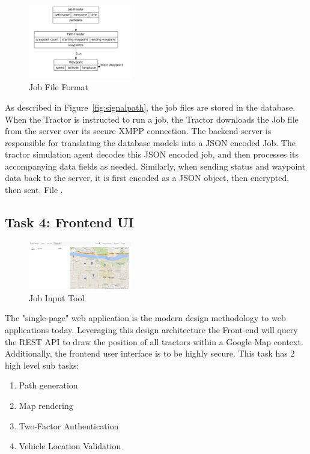 \documentclass[conference,12pt]{IEEEtran}
\begin{document}
\begin{figure}
\centering
\includegraphics[width=0.4\textwidth]{Images/job_file.png}
\caption{Job File Format}
\label{fig:job_file}
\end{figure}

As described in Figure~\ref{fig:signalpath}, the job files are stored in the
database. When the Tractor is instructed to run a job, the Tractor downloads the
Job file from the server over its secure XMPP connection. The backend server is
responsible for translating the database models into a JSON encoded Job. The tractor simulation agent decodes this JSON encoded job, and then processes its accompanying data fields as needed. Similarly, when sending status and waypoint data back to the server, it is first encoded as a JSON object, then encrypted, then sent. 
File \autocite{_json_2014}.

\subsection{Task 4: Frontend UI}
\begin{figure}
\centering
\includegraphics[width=0.4\textwidth]{Images/PlottingV1.png}
\caption{Job Input Tool}
\label{fig:jobinput}
\end{figure}

The "single-page" web application is the modern design methodology to web
applications today. Leveraging this design architecture the Front-end will query the REST API
to draw the position of all tractors within a Google Map context. Additionally, 
the frontend user interface is to be highly secure. This task has
2 high level sub tasks:

\begin{enumerate}
\item Path generation
\item Map rendering
\item Two-Factor Authentication
\item Vehicle Location Validation
\end{enumerate}
\end{document}
